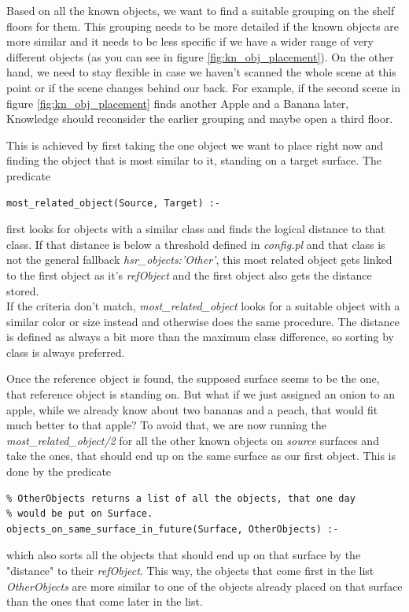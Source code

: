\documentclass[main.tex]{subfiles}
\begin{document}
Based on all the known objects, we want to find a suitable grouping on the shelf floors for them. This grouping needs to be more detailed if the known objects are more similar and it needs to be less specific if we have a wider range of very different objects (as you can see in figure \ref{fig:kn_obj_placement}). On the other hand, we need to stay flexible in case we haven't scanned the whole scene at this point or if the scene changes behind our back. For example, if the second scene in figure \ref{fig:kn_obj_placement} finds another Apple and a Banana later, Knowledge should reconsider the earlier grouping and maybe open a third floor.

This is achieved by first taking the one object we want to place right now and finding the object that is most similar to it, standing on a target surface. The predicate
\begin{lstlisting}
most_related_object(Source, Target) :-
\end{lstlisting}
first looks for objects with a similar class and finds the logical distance to that class. If that distance is below a threshold defined in \textit{config.pl} and that class is not the general fallback \textit{hsr\_objects:'Other'}, this most related object gets linked to the first object as it's \textit{refObject} and the first object also gets the distance stored.\\
If the criteria don't match, \textit{most\_related\_object} looks for a suitable object with a similar color or size instead and otherwise does the same procedure. The distance is defined as always a bit more than the maximum class difference, so sorting by class is always preferred.

Once the reference object is found, the supposed surface seems to be the one, that reference object is standing on. But what if we just assigned an onion to an apple, while we already know about two bananas and a peach, that would fit much better to that apple? To avoid that, we are now running the \textit{most\_related\_object/2} for all the other known objects on \textit{source} surfaces and take the ones, that should end up on the same surface as our first object. This is done by the predicate
\begin{lstlisting}
% OtherObjects returns a list of all the objects, that one day 
% would be put on Surface.
objects_on_same_surface_in_future(Surface, OtherObjects) :-
\end{lstlisting}
which also sorts all the objects that should end up on that surface by the "distance" to their \textit{refObject}. This way, the objects that come first in the list \textit{OtherObjects} are more similar to one of the objects already placed on that surface than the ones that come later in the list.
\end{document}
